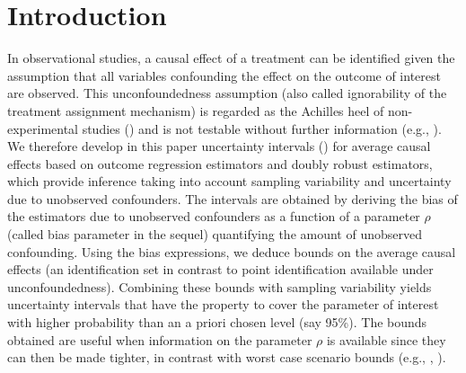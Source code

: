\documentclass[11pt]{article}
\begin{document}
%

\section{Introduction}
In observational studies, a causal effect of a treatment can be identified given the assumption that all variables confounding the effect on the outcome of interest are observed. This unconfoundedness assumption (also called ignorability of the treatment assignment mechanism) is regarded as the Achilles heel of non-experimental studies (\citealp{Liu:2013}) and is not testable without further information (e.g., \citealp{Luna:2006,LunaJ:2014}). %
We
therefore develop in this paper uncertainty intervals (\citealp{Vansteelandt:2006}) for average causal effects based on outcome regression estimators and doubly robust estimators,
which provide inference taking into account sampling variability and uncertainty due to unobserved confounders.
The intervals
are obtained by deriving the bias of the estimators due to unobserved confounders as a function of
a parameter $\rho$ (called bias parameter in the sequel) quantifying the amount of unobserved confounding. Using the bias expressions, we deduce bounds on the average causal effects (an identification set in contrast to point identification available under unconfoundedness). Combining these bounds with sampling variability yields uncertainty intervals that have the property to cover the parameter of interest with higher probability than an a priori chosen level (say 95\%). 
The bounds obtained are useful when information on the parameter $\rho$ is available since they can then be made tighter, in contrast with worst case scenario bounds (e.g., \citealp{M:03}, \citealp{HM:06}). 
\end{document}
